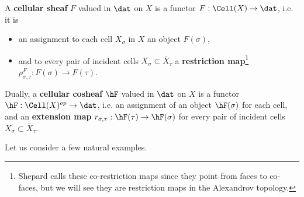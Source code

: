 \begin{defn}\label{defn:cell_sheaves}
	A \textbf{cellular sheaf} $F$ valued in $\dat$ on $X$ is a functor $F:\Cell(X)\to\dat$, i.e. it is 
	\begin{itemize} 
		\item an assignment to each cell $X_{\sigma}$ in $X$ an object $F(\sigma)$,
		\item and to every pair of incident cells $X_{\sigma}\subset \bar{X}_{\tau}$ a \textbf{restriction map}\footnote{Shepard calls these co-restriction maps since they point from faces to co-faces, but we will see they are restriction maps in the Alexandrov topology.} $\rho^F_{\sigma,\tau}:F(\sigma)\to F(\tau)$.
	\end{itemize}
	
	Dually, a \textbf{cellular cosheaf} $\hF$ valued in $\dat$ on $X$ is a functor $\hF:\Cell(X)^{op}\to\dat$, i.e. an assignment of an object $\hF(\sigma)$ for each cell, and an \textbf{extension map} $r_{\sigma,\tau}:\hF(\tau)\to\hF(\sigma)$ for every pair of incident cells $X_{\sigma}\subset\bar{X}_{\tau}$.
\end{defn}

Let us consider a few natural examples.

